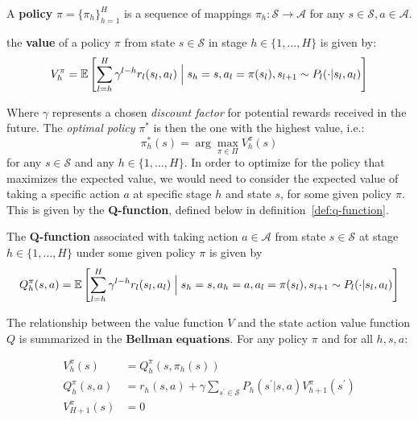 \documentclass{mldsmsc}
\begin{document}
\begin{definition}\label{def:policy}
    A \textbf{policy} $\pi = \{\pi_h\}_{h=1}^{H}$ is a sequence of mappings $\pi_h : \mathcal{S}
    \rightarrow \mathcal{A}$ for any $s \in \mathcal{S}, a \in \mathcal{A}$.
\end{definition}

\begin{definition}\label{def:policy-value}
    the \textbf{value} of a policy $\pi$ from state $s \in \mathcal{S}$ in stage
    $h \in \{1, \ldots, H\}$ is given by:
    \begin{equation}\label{eqn:value-function}
        V_h^{\pi} = \mathbb{E} \left[ \sum_{l = h}^{H} \gamma^{l-h} r_l (s_l, a_l) \Bigm| s_h = s, a_l = \pi(s_l), s_{l+1} \sim P_l(\cdot | s_l, a_l)\right]
    \end{equation}
\end{definition}

Where $\gamma$ represents a chosen \emph{discount factor} for potential rewards received in the future. 
The \emph{optimal policy} $\pi^*$ is then the one with the highest value, i.e.:
\[
\pi_h^*(s) = \arg\max_{\pi \in \Pi} V_h^{\pi}(s)
\]
for any $s \in \mathcal{S}$ and any $h \in \{1,\ldots, H\}$. In order to optimize for the
policy that maximizes the expected value, we would need to consider the expected
value of taking a specific action $a$ at specific stage $h$ and state $s$, for some given policy $\pi$. This is given
by the \textbf{Q-function}, defined below in definition~\ref{def:q-function}.

\begin{definition}\label{def:q-function}
    The \textbf{Q-function} associated with taking action $a \in \mathcal{A}$ from state
    $s \in \mathcal{S}$ at stage $h \in \{1, \ldots, H\}$ under some given policy $\pi$ is given by
    \begin{equation}\label{eqn:q-function}
        Q_h^{\pi}(s,a) = \mathbb{E} \left[ \sum_{l = h}^{H} \gamma^{l-h} r_l (s_l, a_l) \Bigm| s_h = s, 
        a_h = a, a_l = \pi(s_l), s_{l+1} \sim P_l(\cdot | s_l, a_l)\right]
    \end{equation}
\end{definition}

The relationship between the value function $V$ and the state action value function $Q$ is
summarized in the $\textbf{Bellman equations}$. For any policy $\pi$ and for all $h, s, a$:

\begin{align*}
    V_{h}^{\pi}(s) &= Q_{h}^{\pi}(s, \pi_{h}(s))\\
    Q_{h}^{\pi}(s,a) &= r_h(s,a) + \gamma \sum_{s^\prime \in \mathcal{S}} P_h (s^\prime | s, a)V_{h+1}^{\pi}(s^\prime)\\
    V_{H+1}^{\pi}(s) &= 0
\end{align*}
\end{document}

